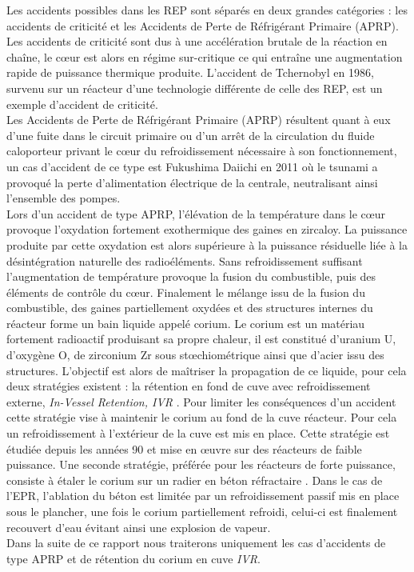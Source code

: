 Les accidents possibles dans les REP sont séparés en deux grandes catégories : les accidents de criticité et les Accidents de Perte de Réfrigérant Primaire (APRP). Les accidents de criticité sont dus à une accélération brutale de la réaction en chaîne, le c\oe ur est alors en régime sur-critique ce qui entraîne une augmentation rapide de puissance thermique produite. L'accident de Tchernobyl en 1986, survenu sur un réacteur d'une technologie différente de celle des REP, est un exemple d'accident de criticité.\\ Les Accidents de Perte de Réfrigérant Primaire (APRP) résultent quant à eux d'une fuite dans le circuit primaire ou d'un arrêt de la circulation du fluide caloporteur privant le c\oe ur du refroidissement nécessaire à son fonctionnement, un cas d'accident de ce type est Fukushima Daiichi en 2011 où le tsunami a provoqué la perte d'alimentation électrique de la centrale, neutralisant ainsi l'ensemble des pompes. \\
Lors d'un accident de type APRP, l'élévation de la température dans le c\oe ur provoque l'oxydation fortement exothermique des gaines en zircaloy. La puissance produite par cette oxydation est alors supérieure à la puissance résiduelle liée à la désintégration naturelle des radioéléments. Sans refroidissement suffisant l'augmentation de température provoque la fusion du combustible, puis des éléments de contrôle du c\oe ur. Finalement le mélange issu de la fusion du combustible, des gaines partiellement oxydées et des structures internes du réacteur forme un bain liquide appelé corium. Le corium est un matériau fortement radioactif produisant sa propre chaleur, il est constitué d'uranium U, d'oxygène O, de zirconium Zr sous st\oe chiométrique ainsi que d'acier issu des structures.  L'objectif est alors de maîtriser la propagation de ce liquide, pour cela deux stratégies existent : la rétention en fond de cuve avec refroidissement externe, \textit{In-Vessel Retention, IVR} \cites{shi_cap1400_2019}{seiler_etudes_2010}. Pour limiter les conséquences d'un accident cette stratégie vise à maintenir le corium au fond de la cuve réacteur. Pour cela un refroidissement à l'extérieur de la cuve est mis en place. Cette stratégie est étudiée depuis les années 90 et mise en \oe uvre sur des réacteurs de faible puissance.
Une seconde stratégie, préférée pour les réacteurs de forte puissance, consiste à étaler le corium sur un radier en béton réfractaire \cite{bouteille_epr_2006}. Dans le cas de l'EPR, l'ablation du béton est limitée par un refroidissement passif mis en place sous le plancher, une fois le corium partiellement refroidi, celui-ci est finalement recouvert d'eau évitant ainsi une explosion de vapeur.\\
Dans la suite de ce rapport nous traiterons uniquement les cas d'accidents de type APRP et de rétention du corium en cuve \textit{IVR}.
